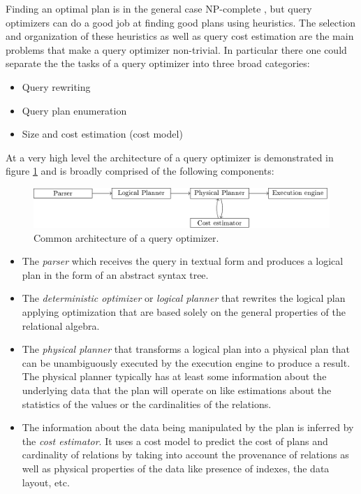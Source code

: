 Finding an optimal plan is in the general case NP-complete
\cite{ullmanInformationIntegrationUsing1997}, but query optimizers can
do a good job at finding good plans using heuristics. The selection
and organization of these heuristics as well as query cost estimation
are the main problems that make a query optimizer non-trivial. In
particular there one could separate the the tasks of a query optimizer
into three broad categories:

\begin{itemize}
\item Query rewriting
\item Query plan enumeration
\item Size and cost estimation (cost model)
\end{itemize}

At a very high level the architecture of a query optimizer is
demonstrated in figure \ref{fig:org171f336} and is broadly
comprised of the following components:

\begin{figure}[p]
\centering
\includegraphics[width=\textwidth]{./imgs/optimizer_architecture.pdf}
\caption{\label{fig:org171f336}Common architecture of a query optimizer.}
\end{figure}

\begin{itemize}
\item The \emph{parser} which receives the query in textual form and produces a
logical plan in the form of an abstract syntax tree.
\item The \emph{deterministic optimizer} or \emph{logical planner} that rewrites the
logical plan applying optimization that are based solely on the
general properties of the relational algebra.
\item The \emph{physical planner} that transforms a logical plan into a
physical plan that can be unambiguously executed by the execution
engine to produce a result. The physical planner typically has at
least some information about the underlying data that the plan will
operate on like estimations about the statistics of the values or
the cardinalities of the relations.
\item The information about the data being manipulated by the plan is
inferred by the \emph{cost estimator}. It uses a cost model to predict
the cost of plans and cardinality of relations by taking into
account the provenance of relations as well as physical properties
of the data like presence of indexes, the data layout, etc.
\end{itemize}

